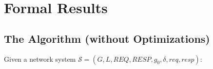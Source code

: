 \section{Formal Results}
\label{sec:formal-results}





\subsection{The Algorithm (without Optimizations)}

Given a network system \(\mathcal S= (G, L, \mathit{REQ},  \mathit{RESP}, g_0, \delta, \mathit{req}, \mathit{resp})\):  

